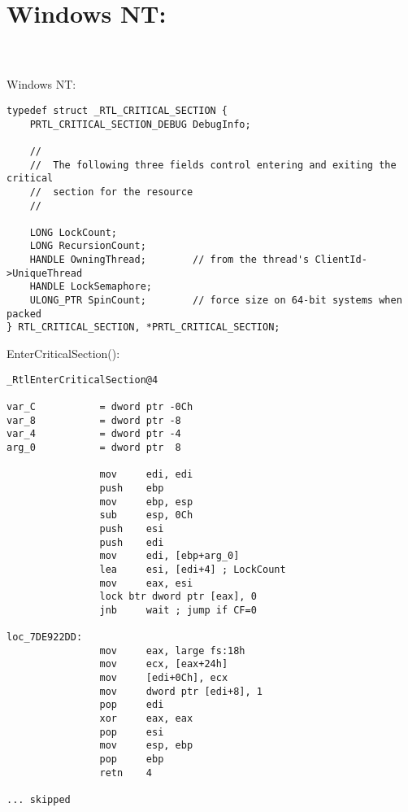 \section{Windows NT: }

\label{critical_sections}

 \\
\\
  
 \gls{Windows NT}:

\begin{lstlisting}[caption=(Windows Research Kernel v1.2) public/sdk/inc/nturtl.h]
typedef struct _RTL_CRITICAL_SECTION {
    PRTL_CRITICAL_SECTION_DEBUG DebugInfo;

    //
    //  The following three fields control entering and exiting the critical
    //  section for the resource
    //

    LONG LockCount;
    LONG RecursionCount;
    HANDLE OwningThread;        // from the thread's ClientId->UniqueThread
    HANDLE LockSemaphore;
    ULONG_PTR SpinCount;        // force size on 64-bit systems when packed
} RTL_CRITICAL_SECTION, *PRTL_CRITICAL_SECTION;
\end{lstlisting}

 EnterCriticalSection():

\begin{lstlisting}[caption=Windows 2008/ntdll.dll/x86 (begin)]
_RtlEnterCriticalSection@4

var_C           = dword ptr -0Ch
var_8           = dword ptr -8
var_4           = dword ptr -4
arg_0           = dword ptr  8

                mov     edi, edi
                push    ebp
                mov     ebp, esp
                sub     esp, 0Ch
                push    esi
                push    edi
                mov     edi, [ebp+arg_0]
                lea     esi, [edi+4] ; LockCount
                mov     eax, esi
                lock btr dword ptr [eax], 0
                jnb     wait ; jump if CF=0

loc_7DE922DD:
                mov     eax, large fs:18h
                mov     ecx, [eax+24h]
                mov     [edi+0Ch], ecx
                mov     dword ptr [edi+8], 1
                pop     edi
                xor     eax, eax
                pop     esi
                mov     esp, ebp
                pop     ebp
                retn    4

... skipped
\end{lstlisting}


